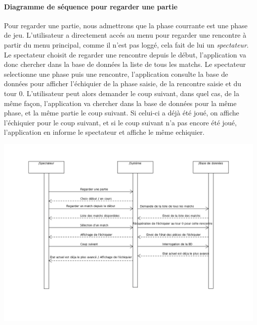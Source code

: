 \documentclass[10pt,a4paper]{report}
\begin{document}
\paragraph{Diagramme de séquence pour regarder une partie}Pour regarder une partie, nous admettrons que la phase courrante est une phase de jeu. L'utilisateur a directement accés au menu pour regarder une rencontre à partir du menu principal, comme il n'est pas loggé, cela fait de lui un \textit{spectateur}. Le spectateur choisit de regarder une rencontre depuis le début, l'application va donc chercher dans la base de données la liste de tous les matchs. Le spectateur selectionne une phase puis une rencontre, l'application consulte la base de données pour afficher l'échiquier de la phase saisie, de la rencontre saisie et du tour 0. L'utilisateur peut alors demander le coup suivant, dans quel cas, de la même façon, l'application va chercher dans la base de données pour la même phase, et la même partie le coup suivant. Si celui-ci a déjà été joué, on affiche l'échiquier pour le coup suivant, et si le coup suivant n'a pas encore été joué, l'application en informe le spectateur et affiche le même echiquier. 
\begin{center}
\includegraphics[width=18cm]{DiagSeqRegarderPartie.png}
\end{center}
\end{document}
